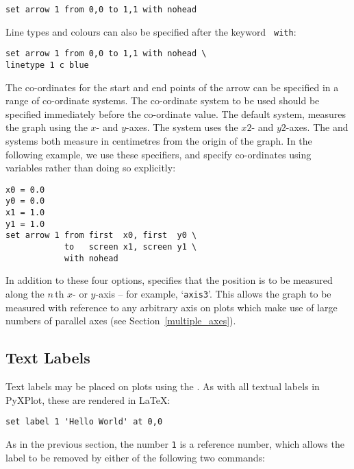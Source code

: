 \begin{verbatim}
set arrow 1 from 0,0 to 1,1 with nohead
\end{verbatim}

\noindent Line types and colours can also be specified after the keyword {\tt
with}:

\begin{verbatim}
set arrow 1 from 0,0 to 1,1 with nohead \
linetype 1 c blue
\end{verbatim}

The co-ordinates for the start and end points of the arrow can be specified in
a range of co-ordinate systems. The co-ordinate system to be used should be
specified immediately before the co-ordinate value. The default system,
\indcot{first} measures the graph using the $x$- and $y$-axes. The
\indcot{second} system uses the $x2$- and $y2$-axes. The  and
\indcot{graph} systems both measure in centimetres from the origin of the
graph. In the following example, we use these specifiers, and specify
co-ordinates using variables rather than doing so explicitly:

\begin{verbatim}
x0 = 0.0
y0 = 0.0
x1 = 1.0
y1 = 1.0
set arrow 1 from first  x0, first  y0 \
            to   screen x1, screen y1 \
            with nohead
\end{verbatim}

In addition to these four options,  specifies that the
position is to be measured along the $n\,$th $x$- or $y$-axis -- for example,
`{\tt axis3}'. This allows the graph to be measured with
reference to any arbitrary axis on plots which make use of large numbers of
parallel axes (see Section~\ref{multiple_axes}).

\subsection{Text Labels}

Text labels may be placed on plots using the . As with all
textual labels in PyXPlot, these are rendered in \LaTeX:

\begin{verbatim}
set label 1 'Hello World' at 0,0
\end{verbatim}

As in the previous section, the number {\tt 1} is a reference number, which
allows the label to be removed by either of the following two commands:

